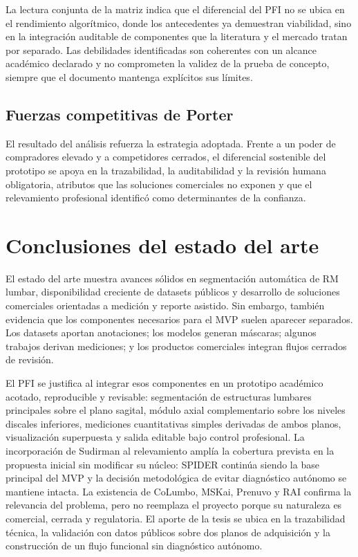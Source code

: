 La lectura conjunta de la matriz indica que el diferencial del PFI no se ubica en el rendimiento algorítmico, donde los antecedentes ya demuestran viabilidad, sino en la integración auditable de componentes que la literatura y el mercado tratan por separado. Las debilidades identificadas son coherentes con un alcance académico declarado y no comprometen la validez de la prueba de concepto, siempre que el documento mantenga explícitos sus límites.

\subsection{Fuerzas competitivas de Porter}


El resultado del análisis refuerza la estrategia adoptada. Frente a un poder de compradores elevado y a competidores cerrados, el diferencial sostenible del prototipo se apoya en la trazabilidad, la auditabilidad y la revisión humana obligatoria, atributos que las soluciones comerciales no exponen y que el relevamiento profesional identificó como determinantes de la confianza.

\section{Conclusiones del estado del arte}

El estado del arte muestra avances sólidos en segmentación automática de RM lumbar, disponibilidad creciente de datasets públicos y desarrollo de soluciones comerciales orientadas a medición y reporte asistido. Sin embargo, también evidencia que los componentes necesarios para el MVP suelen aparecer separados. Los datasets aportan anotaciones; los modelos generan máscaras; algunos trabajos derivan mediciones; y los productos comerciales integran flujos cerrados de revisión.

El PFI se justifica al integrar esos componentes en un prototipo académico acotado, reproducible y revisable: segmentación de estructuras lumbares principales sobre el plano sagital, módulo axial complementario sobre los niveles discales inferiores, mediciones cuantitativas simples derivadas de ambos planos, visualización superpuesta y salida editable bajo control profesional. La incorporación de Sudirman al relevamiento amplía la cobertura prevista en la propuesta inicial sin modificar su núcleo: SPIDER continúa siendo la base principal del MVP y la decisión metodológica de evitar diagnóstico autónomo se mantiene intacta. La existencia de CoLumbo, MSKai, Prenuvo y RAI confirma la relevancia del problema, pero no reemplaza el proyecto porque su naturaleza es comercial, cerrada y regulatoria. El aporte de la tesis se ubica en la trazabilidad técnica, la validación con datos públicos sobre dos planos de adquisición y la construcción de un flujo funcional sin diagnóstico autónomo.
